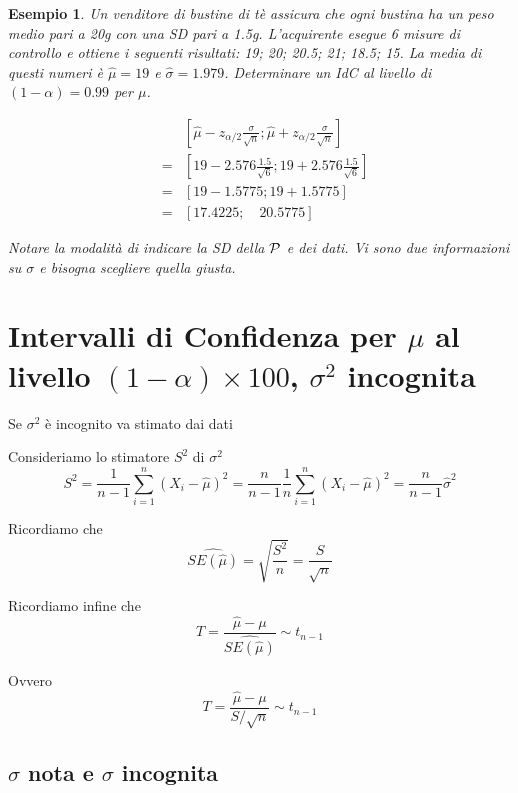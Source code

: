 \documentclass[
  11pt,
]{book}
\theoremstyle{mytheoremstyle}
\theoremstyle{mydefstyle}
\newtheorem{example}{{Esempio}}[section]
\begin{document}
\begin{example}
Un venditore di bustine di tè assicura che ogni bustina ha un
peso medio pari a 20g con una SD pari a 1.5g.
L'acquirente esegue 6 misure di controllo e ottiene i seguenti
risultati: 19; 20; 20.5; 21; 18.5; 15.
La media di questi numeri è \(\hat\mu = 19\) e \(\widehat{\sigma}=1.979\).
Determinare un IdC al livello di \((1-\alpha)=0.99\) per \(\mu\).

\begin{eqnarray*}
& & \left[\hat\mu -z_{\alpha/2} \frac{\sigma} {\sqrt{n}};
          \hat\mu +z_{\alpha/2} \frac{\sigma} {\sqrt{n}} \right] \\
&=& \left[ 19 -2.576 \frac{1.5} {\sqrt{6}}; 19 +2.576 \frac{1.5} {\sqrt{6}} \right] \\
&=& \left[ 19 - 1.5775; 19 + 1.5775 \right]        \\
&=& \left[ 17.4225;\quad 20.5775 \right]
\end{eqnarray*}

Notare la modalità di indicare la SD della \(\cal{P}\) e dei dati.
Vi sono due informazioni su \(\sigma\) e bisogna scegliere quella giusta.
\end{example}

\section{\texorpdfstring{Intervalli di Confidenza per \(\mu\) al livello \((1-\alpha)\times 100\), \(\sigma^2\) incognita}{Intervalli di Confidenza per \textbackslash mu al livello (1-\textbackslash alpha)\textbackslash times 100, \textbackslash sigma\^{}2 incognita}}\label{intervalli-di-confidenza-per-mu-al-livello-1-alphatimes-100-sigma2-incognita}

Se \(\sigma^2\) è incognito va stimato dai dati

Consideriamo lo stimatore \(S^2\) di \(\sigma^2\)
\[S^2=\frac {1}{n-1}\sum_{i=1}^n (X_i-\hat \mu)^2=\frac {n}{n-1}\frac 1 n\sum_{i=1}^n (X_i-\hat \mu)^2=\frac n {n-1}\hat\sigma^2\]

Ricordiamo che
\[\widehat{SE(\hat\mu)}=\sqrt{\frac {S^2}n}=\frac S {\sqrt n}\]

Ricordiamo infine che
\[T=\frac{\hat \mu-\mu}{\widehat{SE(\hat\mu)}}\sim t_{n-1}\]

Ovvero
\[T=\frac{\hat \mu-\mu}{S/\sqrt n}\sim t_{n-1}\]

\subsection{\texorpdfstring{\(\sigma\) nota e \(\sigma\) incognita}{\textbackslash sigma nota e \textbackslash sigma incognita}}\label{sigma-nota-e-sigma-incognita}
\end{document}
